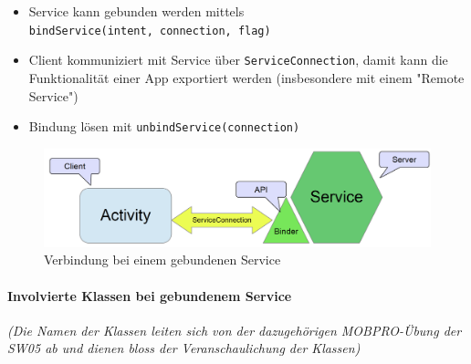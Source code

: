 \documentclass[a4paper]{article}
\begin{document}
		\begin{itemize}
			
			\item Service kann gebunden werden mittels\\
					\texttt{bindService(intent, connection, flag)}
					
			\item Client kommuniziert mit Service über \texttt{ServiceConnection},
			damit kann die Funktionalität einer App exportiert werden
			(insbesondere mit einem "Remote Service")
			
			\item Bindung lösen mit \texttt{unbindService(connection)}
			
		\end{itemize}
	
		\begin{figure}[!htb]
			\centering
			\includegraphics[width=.8\textwidth]{img/binded_service.png}
			\caption{Verbindung bei einem gebundenen Service}
			\label{fig:bound_service}
		\end{figure}
	
		\newpage
	
		\paragraph{Involvierte Klassen bei gebundenem Service}
		
		\textit{(Die Namen der Klassen leiten sich von der dazugehörigen MOBPRO-Übung der SW05 ab und dienen bloss der Veranschaulichung der Klassen)}\\
		
\end{document}

